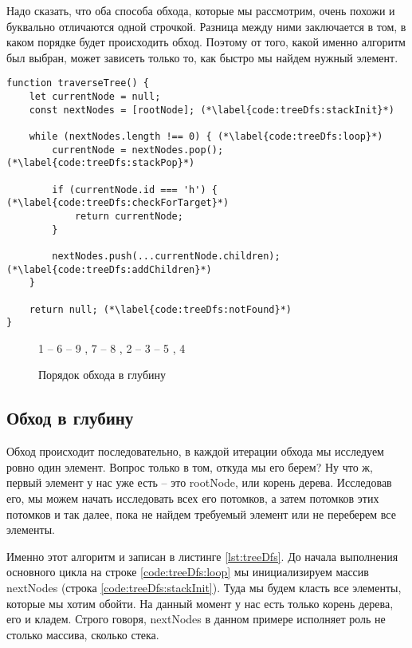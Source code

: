 \documentclass[../../article]{subfiles}
\begin{document}
Надо сказать, что оба способа обхода, которые мы рассмотрим, очень похожи и буквально отличаются одной строчкой. Разница между ними заключается в том, в каком порядке будет происходить обход. Поэтому от того, какой именно алгоритм был выбран, может зависеть только то, как быстро мы найдем нужный элемент.

\begin{figure*}
    \begin{ruledelement}
        \begin{lstlisting}[caption={Обход дерева в глубину}, label={lst:treeDfs}]
function traverseTree() {
    let currentNode = null;
    const nextNodes = [rootNode]; (*\label{code:treeDfs:stackInit}*)

    while (nextNodes.length !== 0) { (*\label{code:treeDfs:loop}*)
        currentNode = nextNodes.pop(); (*\label{code:treeDfs:stackPop}*)

        if (currentNode.id === 'h') { (*\label{code:treeDfs:checkForTarget}*)
            return currentNode;
        }

        nextNodes.push(...currentNode.children); (*\label{code:treeDfs:addChildren}*)
    }

    return null; (*\label{code:treeDfs:notFound}*)
}
        \end{lstlisting}
    \end{ruledelement}
\end{figure*}

\begin{figure}
    \styledgraph
    {
        1 -- { 6 -- { 9 , 7 -- 8 }, 2 -- 3 -- { 5 , 4 }}
    }
    \caption{Порядок обхода в глубину}
    \label{fig:treeDfsOrder}
\end{figure}

\subsection{Обход в глубину}

Обход происходит последовательно, в каждой итерации обхода мы исследуем ровно один элемент. Вопрос только в том, откуда мы его берем? Ну что ж, первый элемент у нас уже есть – это {\firacodebold rootNode}, или корень дерева. Исследовав его, мы можем начать исследовать всех его потомков, а затем потомков этих потомков и так далее, пока не найдем требуемый элемент или не переберем все элементы.

Именно этот алгоритм и записан в листинге \ref{lst:treeDfs}. До начала выполнения основного цикла на строке \ref{code:treeDfs:loop} мы инициализируем массив {\firacodebold nextNodes} (строка \ref{code:treeDfs:stackInit}). Туда мы будем класть все элементы, которые мы хотим обойти. На данный момент у нас есть только корень дерева, его и кладем. Строго говоря, {\firacodebold nextNodes} в данном примере исполняет роль не столько массива, сколько {\firacodebold стека}.
\end{document}
